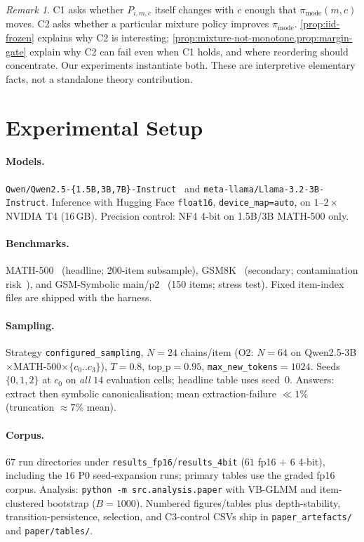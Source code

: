 \documentclass{article}
\newcommand{\pmode}{\pi_{\mathrm{mode}}}
\theoremstyle{plain}
\theoremstyle{definition}
\theoremstyle{remark}
\newtheorem{remark}{Remark}
\begin{document}
\begin{remark}
C1 asks whether $P_{i,m,c}$ itself changes with $c$ enough that $\pmode(m,c)$
moves. C2 asks whether a particular mixture policy improves $\pmode$.
\cref{prop:iid-frozen} explains why C2 is interesting;
\cref{prop:mixture-not-monotone,prop:margin-gate} explain why C2 can fail even
when C1 holds, and where reordering should concentrate. Our experiments
instantiate both. These are interpretive elementary facts, not a standalone
theory contribution.
\end{remark}


\section{Experimental Setup}
\label{sec:setup}

\paragraph{Models.}
\texttt{Qwen/Qwen2.5-\{1.5B,3B,7B\}-Instruct}~\citep{qwen25,qwen2} and
\texttt{meta-llama/Llama-3.2-3B-Instruct}. Inference with Hugging Face
\texttt{float16}, \texttt{device\_map=auto}, on $1$--$2\times$ NVIDIA T4 (16\,GB).
Precision control: NF4 4-bit on 1.5B/3B MATH-500 only.

\paragraph{Benchmarks.}
MATH-500~\citep{math500} (headline; 200-item subsample), GSM8K~\citep{cobbe2021gsm8k}
(secondary; contamination risk~\citep{zhang2024gsm1k}), and GSM-Symbolic
main/p2~\citep{mirzadeh2025gsmsymbolic} (150 items; stress test). Fixed item-index
files are shipped with the harness.

\paragraph{Sampling.}
Strategy \texttt{configured\_sampling}, $N{=}24$ chains/item (O2: $N{=}64$ on
Qwen2.5-3B$\times$MATH-500$\times\{c_0..c_3\}$), $T{=}0.8$, $\mathrm{top\_p}{=}0.95$,
\texttt{max\_new\_tokens}${=}1024$. Seeds $\{0,1,2\}$ at $c_0$ on \emph{all} $14$ evaluation cells;
headline table uses seed~$0$. Answers: extract then symbolic
canonicalisation; mean extraction-failure ${\ll}1\%$ (truncation
${\approx}7\%$ mean).

\paragraph{Corpus.}
$67$ run directories under \texttt{results\_fp16}/\texttt{results\_4bit}
($61$ fp16 + $6$ 4-bit), including the $16$ P0 seed-expansion runs;
primary tables use the graded fp16 corpus. Analysis:
\texttt{python -m src.analysis.paper} with VB-GLMM and item-clustered bootstrap
($B{=}1000$). Numbered figures/tables plus depth-stability,
transition-persistence, selection, and C3-control CSVs ship in
\texttt{paper\_artefacts/} and \texttt{paper/tables/}.
\end{document}
